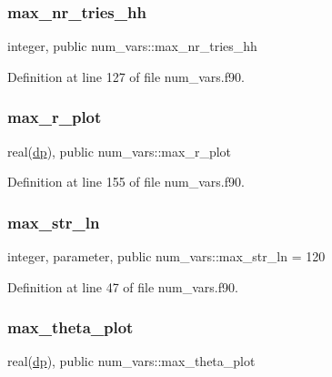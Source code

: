 \subsubsection{\texorpdfstring{max\+\_\+nr\+\_\+tries\+\_\+hh}{max\_nr\_tries\_hh}}
{\footnotesize\ttfamily integer, public num\+\_\+vars\+::max\+\_\+nr\+\_\+tries\+\_\+hh}



Definition at line 127 of file num\+\_\+vars.\+f90.

\mbox{\label{namespacenum__vars_a1f9d7347043448d30c6612558ae569e5}} 
\subsubsection{\texorpdfstring{max\+\_\+r\+\_\+plot}{max\_r\_plot}}
{\footnotesize\ttfamily real(\hyperlink{namespacenum__vars_a03802aa2bd86439d7a9370836fabf3f2}{dp}), public num\+\_\+vars\+::max\+\_\+r\+\_\+plot}



Definition at line 155 of file num\+\_\+vars.\+f90.

\mbox{\label{namespacenum__vars_a3ff2bb983ee80a6735277d6789e6ce7c}} 
\subsubsection{\texorpdfstring{max\+\_\+str\+\_\+ln}{max\_str\_ln}}
{\footnotesize\ttfamily integer, parameter, public num\+\_\+vars\+::max\+\_\+str\+\_\+ln = 120}



Definition at line 47 of file num\+\_\+vars.\+f90.

\mbox{\label{namespacenum__vars_ade6d14ac98ba7f573ef83194808f68b8}} 
\subsubsection{\texorpdfstring{max\+\_\+theta\+\_\+plot}{max\_theta\_plot}}
{\footnotesize\ttfamily real(\hyperlink{namespacenum__vars_a03802aa2bd86439d7a9370836fabf3f2}{dp}), public num\+\_\+vars\+::max\+\_\+theta\+\_\+plot}



